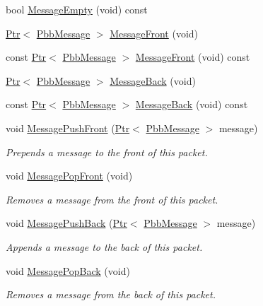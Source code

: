 \begin{DoxyCompactItemize}
bool \hyperlink{classns3_1_1PbbPacket_ababc1f236d351cbeaa930dcf4efd7b8e}{Message\+Empty} (void) const 
\item 
\hyperlink{classns3_1_1Ptr}{Ptr}$<$ \hyperlink{classns3_1_1PbbMessage}{Pbb\+Message} $>$ \hyperlink{classns3_1_1PbbPacket_af95d77ed15f37a85b6609ab61637f1fa}{Message\+Front} (void)
\item 
const \hyperlink{classns3_1_1Ptr}{Ptr}$<$ \hyperlink{classns3_1_1PbbMessage}{Pbb\+Message} $>$ \hyperlink{classns3_1_1PbbPacket_a627e21ddd27205acd0aaa5cddf996ffd}{Message\+Front} (void) const 
\item 
\hyperlink{classns3_1_1Ptr}{Ptr}$<$ \hyperlink{classns3_1_1PbbMessage}{Pbb\+Message} $>$ \hyperlink{classns3_1_1PbbPacket_aa201846749ef97b421a755e342cbf769}{Message\+Back} (void)
\item 
const \hyperlink{classns3_1_1Ptr}{Ptr}$<$ \hyperlink{classns3_1_1PbbMessage}{Pbb\+Message} $>$ \hyperlink{classns3_1_1PbbPacket_a054c81b0f0bdbd5db7cb1f9318ef1865}{Message\+Back} (void) const 
\item 
void \hyperlink{classns3_1_1PbbPacket_aaf2f2e69201597ccc75124cc11100db1}{Message\+Push\+Front} (\hyperlink{classns3_1_1Ptr}{Ptr}$<$ \hyperlink{classns3_1_1PbbMessage}{Pbb\+Message} $>$ message)
\begin{DoxyCompactList}\small\item\em Prepends a message to the front of this packet. \end{DoxyCompactList}\item 
void \hyperlink{classns3_1_1PbbPacket_a8f0edb2bd6d2921bb3ddf3b04a85e557}{Message\+Pop\+Front} (void)
\begin{DoxyCompactList}\small\item\em Removes a message from the front of this packet. \end{DoxyCompactList}\item 
void \hyperlink{classns3_1_1PbbPacket_a4a3170001ef758d9c9c4375b8f089826}{Message\+Push\+Back} (\hyperlink{classns3_1_1Ptr}{Ptr}$<$ \hyperlink{classns3_1_1PbbMessage}{Pbb\+Message} $>$ message)
\begin{DoxyCompactList}\small\item\em Appends a message to the back of this packet. \end{DoxyCompactList}\item 
void \hyperlink{classns3_1_1PbbPacket_aa642ff6b06a1da2c5af389b8c552edcd}{Message\+Pop\+Back} (void)
\begin{DoxyCompactList}\small\item\em Removes a message from the back of this packet. \end{DoxyCompactList}\item 

\end{DoxyCompactItemize}
